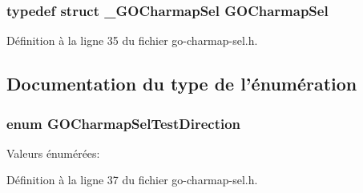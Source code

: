 \subsubsection[{GOCharmapSel}]{\setlength{\rightskip}{0pt plus 5cm}typedef struct {\bf \_\-GOCharmapSel} {\bf GOCharmapSel}}\label{go-charmap-sel_8h_a2b6814bfaea8f44b0e895e922c80bdb1}


Définition à la ligne 35 du fichier go-\/charmap-\/sel.h.



\subsection{Documentation du type de l'énumération}
\subsubsection[{GOCharmapSelTestDirection}]{\setlength{\rightskip}{0pt plus 5cm}enum {\bf GOCharmapSelTestDirection}}\label{go-charmap-sel_8h_a758de5be5c36f44240e2a4fb4fcd7912}
\begin{Desc}
\item[Valeurs énumérées: ]\par
\begin{description}
\item[{\em 
GO\_\-CHARMAP\_\-SEL\_\-TO\_\-UTF8\label{go-charmap-sel_8h_a758de5be5c36f44240e2a4fb4fcd7912a8d47de8eb25d43aebcf157ed4ab82418}
}]\item[{\em 
GO\_\-CHARMAP\_\-SEL\_\-FROM\_\-UTF8\label{go-charmap-sel_8h_a758de5be5c36f44240e2a4fb4fcd7912a1d7f51cea57d63a621d84cfa53d2152d}
}]\end{description}
\end{Desc}



Définition à la ligne 37 du fichier go-\/charmap-\/sel.h.




